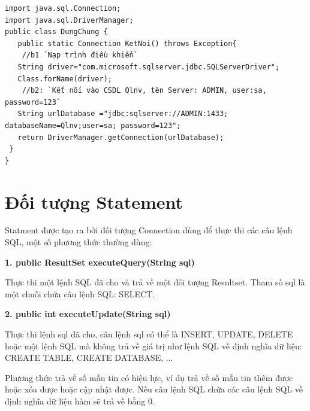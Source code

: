 \begin{lstlisting}[escapechar=`]
import java.sql.Connection;
import java.sql.DriverManager;
public class DungChung {
   public static Connection KetNoi() throws Exception{
	//b1 `Nạp trình điều khiển`
   String driver="com.microsoft.sqlserver.jdbc.SQLServerDriver";
   Class.forName(driver);
	//b2: `Kết nối vào CSDL Qlnv, tên Server: ADMIN, user:sa, password=123`
   String urlDatabase ="jdbc:sqlserver://ADMIN:1433; databaseName=Qlnv;user=sa; password=123";
   return DriverManager.getConnection(urlDatabase);
 }
}
\end{lstlisting}


\section{Đối tượng Statement}
Statment được tạo ra bởi đối tượng Connection dùng để thực thi các câu lệnh SQL, một số phương thức thường dùng:

\textbf{1. public ResultSet executeQuery(String sql)}

Thực thi một lệnh SQL đã cho và trả về một đối tượng Resultset. Tham số sql là một chuỗi chứa câu lệnh SQL: SELECT. 


\textbf{2. public int executeUpdate(String sql)}

Thực thi lệnh sql đã cho, câu lệnh sql có thể là INSERT, UPDATE, DELETE hoặc một lệnh SQL mà không trả về giá trị  như lệnh SQL về định nghĩa dữ liệu: CREATE TABLE, CREATE DATABASE, ... 

Phương thức trả về số mẫu tin có hiệu lực, ví dụ trả về số mẫu tin thêm được hoặc xóa được hoặc cập nhật được. Nếu câu lệnh SQL chứa các câu lệnh SQL về định nghĩa dữ liệu hàm sẽ trả về bằng 0.

